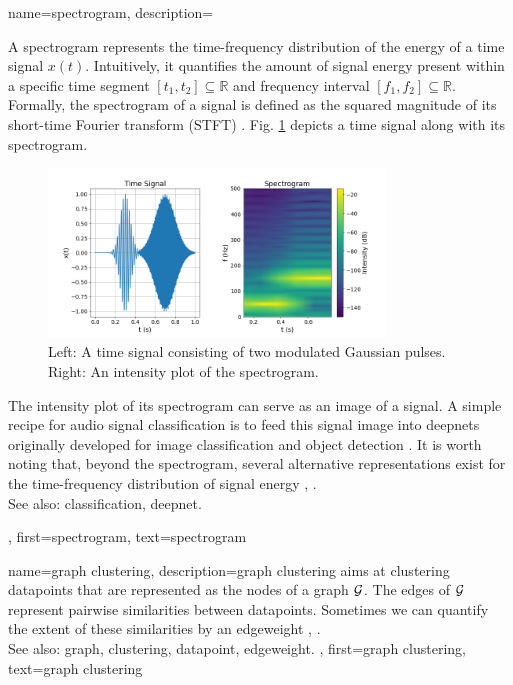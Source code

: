 {name={spectrogram},
	description={A spectrogram represents the time-frequency distribution of the energy of a time signal $x(t)$.  
		Intuitively, it quantifies the amount of signal energy present within a specific time segment 
		$[t_{1},t_{2}] \subseteq \mathbb{R}$ and frequency interval $[f_{1},f_{2}]\subseteq \mathbb{R}$. 
		Formally, the spectrogram of a signal is defined as the squared magnitude of its 
		short-time Fourier transform (STFT) \cite{cohen1995time}.
        		Fig. \ref{fig:spectrogram_dict} depicts a time signal along with its spectrogram. 
	\begin{figure}[H]
		\centering
		\includegraphics[width=0.8\textwidth]{assets/spectrogram.png}
		\caption{Left: A time signal consisting of two modulated Gaussian pulses. Right: An intensity 
		plot of the spectrogram.
		\label{fig:spectrogram_dict}}
	\end{figure}
        		The intensity plot of its spectrogram can serve as an image of a signal. A 
		simple recipe for audio signal \gls{classification} is to feed this signal image 
		into \glspl{deepnet} originally developed for image \gls{classification} and object detection \cite{Li:2022aa}. 
		It is worth noting that, beyond the spectrogram, several alternative representations exist 
		for the time-frequency distribution of signal energy \cite{TimeFrequencyAnalysisBoashash}, \cite{MallatBook}.
					\\ 
		See also: \gls{classification}, \gls{deepnet}.}, 
	first={spectrogram},
	text={spectrogram} 
}

{name={graph clustering},
	description={\Gls{graph} \gls{clustering} aims at 
		\gls{clustering} \glspl{datapoint} that are represented as the nodes 
		of a \gls{graph} $\mathcal{G}$. The edges of $\mathcal{G}$ represent 
		pairwise similarities between \glspl{datapoint}. Sometimes we
		can quantify the extent of these similarities by an \gls{edgeweight} \cite{FlowSpecClustering2021}, \cite{Luxburg2007}.
					\\ 
		See also: \gls{graph}, \gls{clustering}, \gls{datapoint}, \gls{edgeweight}. }, 
	first={graph clustering},
	text={graph clustering} 
}

